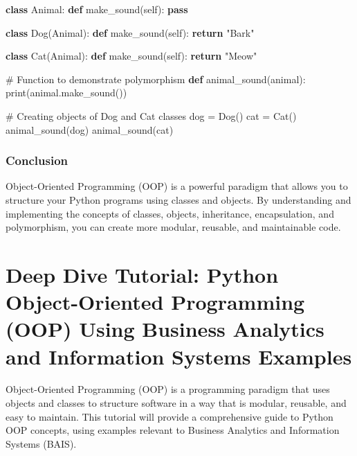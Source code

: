 \documentclass[
  letterpaper,
  DIV=11,
  numbers=noendperiod]{scrreprt}
\newenvironment{Shaded}{\begin{snugshade}}{\end{snugshade}}
\newcommand{\BuiltInTok}[1]{\textcolor[rgb]{0.00,0.23,0.31}{#1}}
\newcommand{\CommentTok}[1]{\textcolor[rgb]{0.37,0.37,0.37}{#1}}
\newcommand{\ControlFlowTok}[1]{\textcolor[rgb]{0.00,0.23,0.31}{\textbf{#1}}}
\newcommand{\KeywordTok}[1]{\textcolor[rgb]{0.00,0.23,0.31}{\textbf{#1}}}
\newcommand{\NormalTok}[1]{\textcolor[rgb]{0.00,0.23,0.31}{#1}}
\newcommand{\OperatorTok}[1]{\textcolor[rgb]{0.37,0.37,0.37}{#1}}
\newcommand{\StringTok}[1]{\textcolor[rgb]{0.13,0.47,0.30}{#1}}
\newcommand{\VariableTok}[1]{\textcolor[rgb]{0.07,0.07,0.07}{#1}}
\begin{document}
\begin{Shaded}
\begin{Highlighting}[]
\KeywordTok{class}\NormalTok{ Animal:}
    \KeywordTok{def}\NormalTok{ make\_sound(}\VariableTok{self}\NormalTok{):}
        \ControlFlowTok{pass}

\KeywordTok{class}\NormalTok{ Dog(Animal):}
    \KeywordTok{def}\NormalTok{ make\_sound(}\VariableTok{self}\NormalTok{):}
        \ControlFlowTok{return} \StringTok{"Bark"}

\KeywordTok{class}\NormalTok{ Cat(Animal):}
    \KeywordTok{def}\NormalTok{ make\_sound(}\VariableTok{self}\NormalTok{):}
        \ControlFlowTok{return} \StringTok{"Meow"}

\CommentTok{\# Function to demonstrate polymorphism}
\KeywordTok{def}\NormalTok{ animal\_sound(animal):}
    \BuiltInTok{print}\NormalTok{(animal.make\_sound())}

\CommentTok{\# Creating objects of Dog and Cat classes}
\NormalTok{dog }\OperatorTok{=}\NormalTok{ Dog()}
\NormalTok{cat }\OperatorTok{=}\NormalTok{ Cat()}
\NormalTok{animal\_sound(dog)  }
\NormalTok{animal\_sound(cat)  }
\end{Highlighting}
\end{Shaded}

\subsection{Conclusion}\label{conclusion-13}

Object-Oriented Programming (OOP) is a powerful paradigm that allows you
to structure your Python programs using classes and objects. By
understanding and implementing the concepts of classes, objects,
inheritance, encapsulation, and polymorphism, you can create more
modular, reusable, and maintainable code.


\chapter{Deep Dive Tutorial: Python Object-Oriented Programming (OOP)
Using Business Analytics and Information Systems
Examples}\label{deep-dive-tutorial-python-object-oriented-programming-oop-using-business-analytics-and-information-systems-examples}

Object-Oriented Programming (OOP) is a programming paradigm that uses
objects and classes to structure software in a way that is modular,
reusable, and easy to maintain. This tutorial will provide a
comprehensive guide to Python OOP concepts, using examples relevant to
Business Analytics and Information Systems (BAIS).
\end{document}
